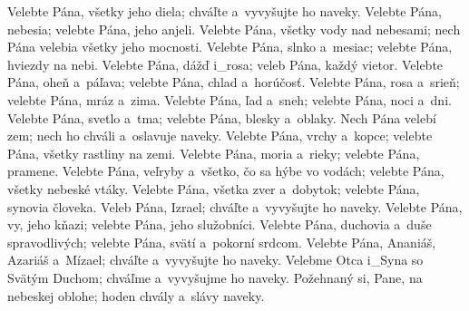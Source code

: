 Velebte Pána, všetky jeho diela;
chváľte a~vyvyšujte ho naveky.
\versseparator
Velebte Pána, nebesia;
velebte Pána, jeho anjeli.
\versseparator
Velebte Pána, všetky vody nad nebesami;
nech Pána velebia všetky jeho mocnosti.
\versseparator
Velebte Pána, slnko a~mesiac;
velebte Pána, hviezdy na nebi.
\versseparator
Velebte Pána, dážď i_rosa;
veleb Pána, každý vietor.
\versseparator
Velebte Pána, oheň a~páľava;
velebte Pána, chlad a~horúčosť.
\versseparator
Velebte Pána, rosa a~srieň;
velebte Pána, mráz a~zima.
\versseparator
Velebte Pána, ľad a~sneh;
velebte Pána, noci a~dni.
\versseparator
Velebte Pána, svetlo a~tma;
velebte Pána, blesky a~oblaky.
\versseparator
Nech Pána velebí zem;
nech ho chváli a~oslavuje naveky.
\versseparator
Velebte Pána, vrchy a~kopce;
velebte Pána, všetky rastliny na zemi.
\versseparator
Velebte Pána, moria a~rieky;
velebte Pána, pramene.
\versseparator
Velebte Pána, veľryby a~všetko, čo sa hýbe vo vodách;
velebte Pána, všetky nebeské vtáky.
\versseparator
Velebte Pána, všetka zver a~dobytok;
velebte Pána, synovia človeka.
\versseparator
Veleb Pána, Izrael;
chváľte a~vyvyšujte ho naveky.
\versseparator
Velebte Pána, vy, jeho kňazi;
velebte Pána, jeho služobníci.
\versseparator
Velebte Pána, duchovia a~duše spravodlivých;
velebte Pána, svätí a~pokorní srdcom.
\versseparator
Velebte Pána, Ananiáš, Azariáš a~Mízael;
chváľte a~vyvyšujte ho naveky.
\versseparator
Velebme Otca i_Syna so Svätým Duchom;
chváľme a~vyvyšujme ho naveky.
\versseparator
Požehnaný si, Pane, na nebeskej oblohe;
hoden chvály a~slávy naveky.